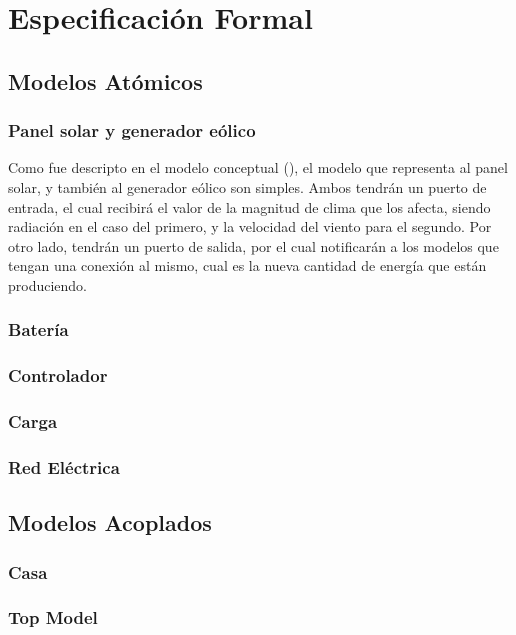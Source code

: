 \section{Especificación Formal}

\subsection{Modelos Atómicos}

\subsubsection{Panel solar y generador eólico}
Como fue descripto en el modelo conceptual (\cite{section:modeloConceptual}),
el modelo que representa al panel solar, y también al generador eólico son
simples. Ambos tendrán un puerto de entrada, el cual recibirá el valor de la
magnitud de clima que los afecta, siendo radiación en el caso del primero, y
la velocidad del viento para el segundo. Por otro lado, tendrán un puerto de
salida, por el cual notificarán a los modelos que tengan una conexión al
mismo, cual es la nueva cantidad de energía que están produciendo.


\subsubsection{Batería}
\subsubsection{Controlador}
\subsubsection{Carga}
\subsubsection{Red Eléctrica}

\subsection{Modelos Acoplados}

\subsubsection{Casa}
\subsubsection{Top Model}